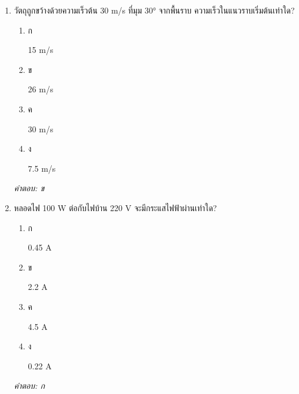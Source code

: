 \documentclass[12pt]{article}
\begin{document}
\begin{enumerate}[label=\arabic*., itemsep=0.5\baselineskip, topsep=0.5\baselineskip, leftmargin=*]
\item วัตถุถูกขว้างด้วยความเร็วต้น 30 m/s ที่มุม 30° จากพื้นราบ ความเร็วในแนวราบเริ่มต้นเท่าใด?
\begin{enumerate}[label=\alph*)., itemsep=0.3\baselineskip, topsep=0.3\baselineskip]
\item ก\ 
\begin{minipage}[t]{0.9\linewidth}
\raggedright 15 m/s
\end{minipage}
\item ข\ 
\begin{minipage}[t]{0.9\linewidth}
\raggedright 26 m/s
\end{minipage}
\item ค\ 
\begin{minipage}[t]{0.9\linewidth}
\raggedright 30 m/s
\end{minipage}
\item ง\ 
\begin{minipage}[t]{0.9\linewidth}
\raggedright 7.5 m/s
\end{minipage}
\end{enumerate}
\vspace{-0.3\baselineskip}
\begin{small}
\textit{คำตอบ: ข}
\end{small}

\item หลอดไฟ 100 W ต่อกับไฟบ้าน 220 V จะมีกระแสไฟฟ้าผ่านเท่าใด?
\begin{enumerate}[label=\alph*)., itemsep=0.3\baselineskip, topsep=0.3\baselineskip]
\item ก\ 
\begin{minipage}[t]{0.9\linewidth}
\raggedright 0.45 A
\end{minipage}
\item ข\ 
\begin{minipage}[t]{0.9\linewidth}
\raggedright 2.2 A
\end{minipage}
\item ค\ 
\begin{minipage}[t]{0.9\linewidth}
\raggedright 4.5 A
\end{minipage}
\item ง\ 
\begin{minipage}[t]{0.9\linewidth}
\raggedright 0.22 A
\end{minipage}
\end{enumerate}
\vspace{-0.3\baselineskip}
\begin{small}
\textit{คำตอบ: ก}
\end{small}


\end{enumerate}
\end{document}
